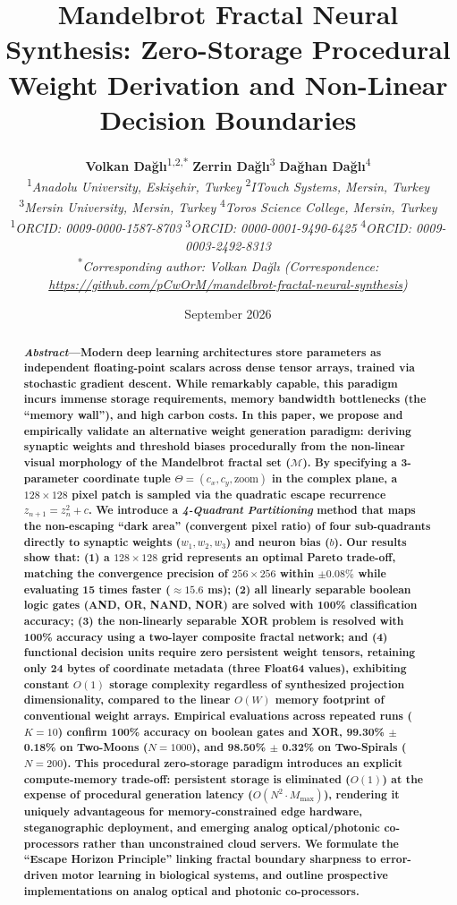 \documentclass[10pt,journal,compsoc,twocolumn]{article}
\title{\textbf{\Large Mandelbrot Fractal Neural Synthesis: Zero-Storage Procedural Weight Derivation and Non-Linear Decision Boundaries}}
\author{
    \textbf{Volkan Dağlı}\textsuperscript{1,2,*} \quad \textbf{Zerrin Dağlı}\textsuperscript{3} \quad \textbf{Dağhan Dağlı}\textsuperscript{4} \\
    \textsuperscript{1}\textit{Anadolu University, Eskişehir, Turkey} \quad \textsuperscript{2}\textit{ITouch Systems, Mersin, Turkey} \\
    \textsuperscript{3}\textit{Mersin University, Mersin, Turkey} \quad \textsuperscript{4}\textit{Toros Science College, Mersin, Turkey} \\
    \textsuperscript{1}\textit{ORCID: 0009-0000-1587-8703} \quad \textsuperscript{3}\textit{ORCID: 0000-0001-9490-6425} \quad \textsuperscript{4}\textit{ORCID: 0009-0003-2492-8313} \\
    \textsuperscript{*}\textit{Corresponding author: Volkan Dağlı (Correspondence: \url{https://github.com/pCwOrM/mandelbrot-fractal-neural-synthesis})}
}
\date{September 2026}
\begin{document}
\linenumbers

\maketitle

\begin{abstract}
\textbf{\textit{Abstract}---Modern deep learning architectures store parameters as independent floating-point scalars across dense tensor arrays, trained via stochastic gradient descent. While remarkably capable, this paradigm incurs immense storage requirements, memory bandwidth bottlenecks (the ``memory wall''), and high carbon costs. In this paper, we propose and empirically validate an alternative weight generation paradigm: deriving synaptic weights and threshold biases procedurally from the non-linear visual morphology of the Mandelbrot fractal set ($\mathcal{M}$). By specifying a 3-parameter coordinate tuple $\Theta = (c_x, c_y, \text{zoom})$ in the complex plane, a $128 \times 128$ pixel patch is sampled via the quadratic escape recurrence $z_{n+1} = z_n^2 + c$. We introduce a \textit{4-Quadrant Partitioning} method that maps the non-escaping ``dark area'' (convergent pixel ratio) of four sub-quadrants directly to synaptic weights ($w_1, w_2, w_3$) and neuron bias ($b$). Our results show that: (1) a $128 \times 128$ grid represents an optimal Pareto trade-off, matching the convergence precision of $256 \times 256$ within $\pm 0.08\%$ while evaluating 15 times faster ($\approx 15.6$ ms); (2) all linearly separable boolean logic gates (AND, OR, NAND, NOR) are solved with 100\% classification accuracy; (3) the non-linearly separable XOR problem is resolved with 100\% accuracy using a two-layer composite fractal network; and (4) functional decision units require zero persistent weight tensors, retaining only 24 bytes of coordinate metadata (three Float64 values), exhibiting constant $O(1)$ storage complexity regardless of synthesized projection dimensionality, compared to the linear $O(W)$ memory footprint of conventional weight arrays. Empirical evaluations across repeated runs ($K=10$) confirm 100\% accuracy on boolean gates and XOR, 99.30\% $\pm$ 0.18\% on Two-Moons ($N=1000$), and 98.50\% $\pm$ 0.32\% on Two-Spirals ($N=200$). This procedural zero-storage paradigm introduces an explicit compute-memory trade-off: persistent storage is eliminated ($O(1)$) at the expense of procedural generation latency ($O(N^2 \cdot M_{\max})$), rendering it uniquely advantageous for memory-constrained edge hardware, steganographic deployment, and emerging analog optical/photonic co-processors rather than unconstrained cloud servers. We formulate the ``Escape Horizon Principle'' linking fractal boundary sharpness to error-driven motor learning in biological systems, and outline prospective implementations on analog optical and photonic co-processors.}
\end{abstract}
\end{document}

